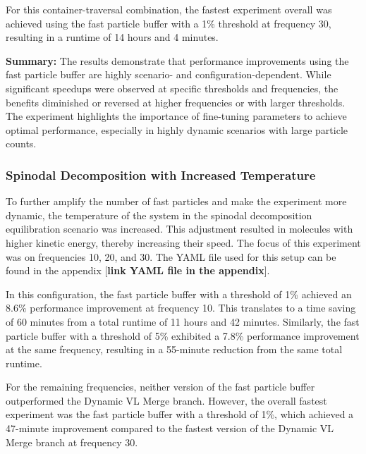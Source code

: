 For this container-traversal combination, the fastest experiment overall was achieved using the fast particle buffer with a 1\% threshold at frequency 30, resulting in a runtime of 14 hours and 4 minutes.

\textbf{Summary:}  
The results demonstrate that performance improvements using the fast particle buffer are highly scenario- and configuration-dependent. While significant speedups were observed at specific thresholds and frequencies, the benefits diminished or reversed at higher frequencies or with larger thresholds. The experiment highlights the importance of fine-tuning parameters to achieve optimal performance, especially in highly dynamic scenarios with large particle counts.



\subsubsection{Spinodal Decomposition with Increased Temperature}

To further amplify the number of fast particles and make the experiment more dynamic, the temperature of the system in the spinodal decomposition equilibration scenario was increased. This adjustment resulted in molecules with higher kinetic energy, thereby increasing their speed. The focus of this experiment was on frequencies 10, 20, and 30. The YAML file used for this setup can be found in the appendix [\textbf{link YAML file in the appendix}].

In this configuration, the fast particle buffer with a threshold of 1\% achieved an 8.6\% performance improvement at frequency 10. This translates to a time saving of 60 minutes from a total runtime of 11 hours and 42 minutes. Similarly, the fast particle buffer with a threshold of 5\% exhibited a 7.8\% performance improvement at the same frequency, resulting in a 55-minute reduction from the same total runtime.

For the remaining frequencies, neither version of the fast particle buffer outperformed the Dynamic VL Merge branch. However, the overall fastest experiment was the fast particle buffer with a threshold of 1\%, which achieved a 47-minute improvement compared to the fastest version of the Dynamic VL Merge branch at frequency 30.

